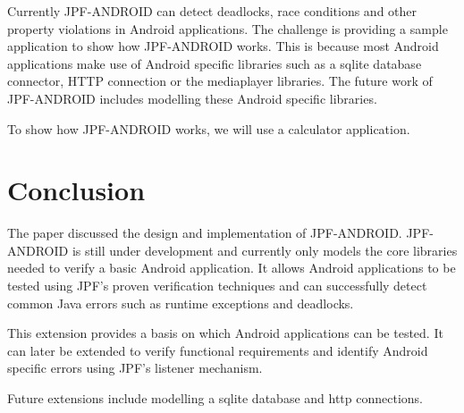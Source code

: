 \documentclass{acm_proc_article-sp}
\begin{document}
Currently JPF-ANDROID can detect deadlocks, race conditions and other property violations in Android applications. The challenge is
providing a sample application to show how JPF-ANDROID works. This is because most Android applications make use of Android specific
libraries such as a sqlite database connector, HTTP connection or the mediaplayer libraries. The future work of JPF-ANDROID
includes modelling these Android specific libraries.

To show how JPF-ANDROID works, we will use a calculator application.






\section{Conclusion}
The paper discussed the design and implementation of JPF-ANDROID. JPF-ANDROID is still under development and currently only models
the core libraries needed to verify a basic Android application. It allows Android applications to be tested using JPF's proven verification
techniques and can successfully detect common Java errors such as runtime exceptions and deadlocks. 

This extension provides a basis on which Android applications can be tested. It can later be extended to verify functional requirements
and identify Android specific errors using JPF's listener mechanism.

Future extensions include modelling a sqlite database and http connections.

%

\end{document}
